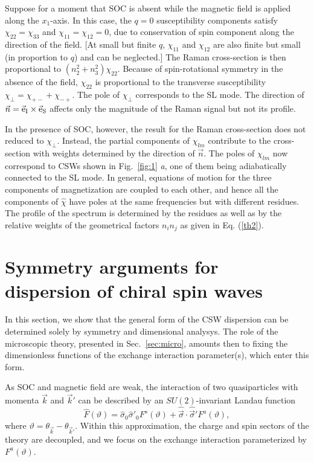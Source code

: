 \documentclass[prb,aps,twocolumn]{revtex4}
\newcommand{\beq}{\begin{equation}}
\newcommand{\eeq}{\end{equation}}
\newcommand{\bk}{{\vec k}}
\begin{document}
Suppose for a moment that SOC is absent while the magnetic field
is applied along the $x_1$-axis. In this case, the $q=0$
susceptibility components satisfy $\chi_{22}=\chi_{33}$  and
$\chi_{11}=\chi_{12}=0$, due to conservation of spin component
along the direction of the field.\cite{SM_ESR} [At small but finite $q$,  $\chi_{11}$ and $\chi_{12}$ are also finite but small (in proportion to $q$) and can be neglected.] The Raman cross-section is then
proportional to $(n_2^2+n_3^2)\chi_{22}$. Because of
spin-rotational symmetry in the absence of the field, $\chi_{22}$
is proportional to the transverse susceptibility
$\chi_\perp=\chi_{+-}+\chi_{-+}$. \cite{Das,perez} The pole of
$\chi_{\perp}$ corresponds to the SL
mode.\cite{silin:1958,leggett:1970,statphysII} The direction of
$\vec n=\vec{\rm e}_{{\rm I}}\times \vec{\rm e}_{{\rm S}}$ affects
only the magnitude of the Raman signal but not its profile.

In the presence of SOC, however, the result for the Raman
cross-section does not reduced to $\chi_\perp$. Instead, the
partial components of $\chi_{lm}$ contribute to the cross-section
with weights determined by the direction of $\vec n$. The poles of
$\chi_{lm}$ now correspond to CSWs shown in Fig.~\ref{fig:1}{\em
a}, one of them being adiabatically connected to the SL mode. In
general, equations of motion for the three components of
magnetization are coupled to each other, and hence all the
components of $\hat \chi$ have poles at the same frequencies but
with different residues. The profile of the spectrum is determined
by the residues as well as by the relative weights of the
geometrical factors $n_in_j$ as given in Eq. (\ref{th2}).


\section{Symmetry arguments for dispersion of chiral spin
waves}\label{sec:symm} In this section, we show that the general
form of the CSW dispersion can be determined solely by symmetry
and dimensional analysys. The role of the microscopic theory,
presented in Sec.~\ref{sec:micro}, amounts then to fixing the
dimensionless functions of the exchange interaction parameter(s),
which enter this form.

As SOC and magnetic field are weak, the interaction of two
quasiparticles with momenta $\bk$ and $\bk'$ can be described by
an $SU(2)$-invariant Landau function \beq \hat F(\vartheta)=\hat
\sigma_0\hat\sigma'_0F^s(\vartheta)+\hat{\vec\sigma}\cdot\hat{\vec\sigma}'F^a(\vartheta),\eeq
where $\vartheta=\theta_\bk-\theta_{\bk'}$. Within this
approximation, the charge and spin sectors of the theory are
decoupled, and we focus on the exchange interaction parameterized
by $F^a(\vartheta)$.
\end{document}
